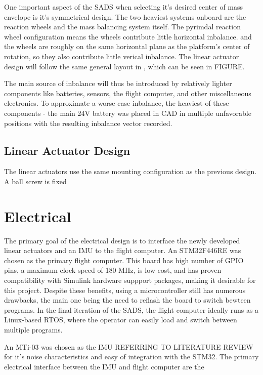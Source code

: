 One important aspect of the SADS when selecting it's desired center of mass envelope is it's symmetrical design. The two heaviest systems onboard are the reaction wheels and the mass balancing system itself. The pyrimdal reaction wheel configuration means the wheels contribute little horizontal inbalance. and the wheels are roughly on the same horizontal plane as the platform's center of rotation, so they also contribute little verical inbalance. The linear actuator design will follow the same general layout in \cite{gilman_automatic_2024}, which can be seen in FIGURE. 

The main source of inbalance will thus be introduced by relatively lighter components like batteries, sensors, the flight computer, and other miscellaneous electronics. To approximate a worse case inbalance, the heaviest of these components - the main 24V battery was placed in CAD in multiple unfavorable positions with the resulting inbalance vector recorded. 


\subsection{Linear Actuator Design}

The linear actuators use the same mounting configuration as the previous design. A ball screw is fixed 


\section{Electrical}

The primary goal of the electrical design is to interface the newly developed linear actuators and an IMU to the flight computer. An STM32F446RE was chosen as the primary flight computer. This board has high number of GPIO pins, a maximum clock speed of 180 MHz, is low cost, and has proven compatibility with Simulink hardware suppport packages, making it desirable for this project. Despite these benefits, using a microcontroller still has numerous drawbacks, the main one being the need to reflash the board to switch bewteen programs. In the final iteration of the SADS, the flight computer ideally runs as a Linux-based RTOS, where the operator can easily load and switch between multiple programs. 

An MTi-03 was chosen as the IMU REFERRING TO LITERATURE REVIEW for it's noise characteristics and easy of integration with the STM32. The primary electrical interface between the IMU and flight computer are the  

